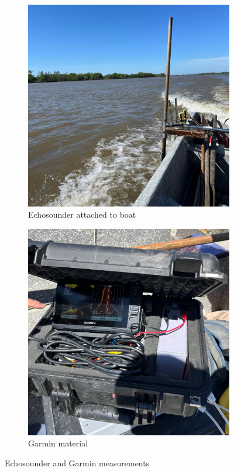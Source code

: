 \begin{figure}[H]
    \centering
    \begin{subfigure}[b]{0.48\textwidth}
        \includegraphics[width=\linewidth]{figures/ch4/Echosounder.jpg}
        \caption{Echosounder attached to boat}
        
    \end{subfigure}
    \hfill
    \begin{subfigure}[b]{0.48\textwidth}
        \includegraphics[width=\linewidth]{figures/ch4/garmin.jpg}
        \caption{Garmin material}
        
    \end{subfigure}
    \caption{Echosounder and Garmin measurements}
    \label{fig:Garmin}
\end{figure}


